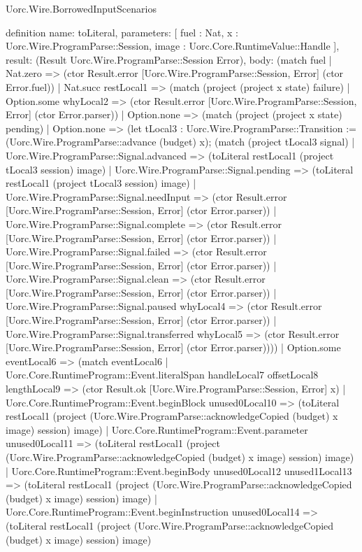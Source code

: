 \begin{lexlean}{Uorc.Wire.BorrowedInputScenarios}
\begin{semanticmodule}
definition{
  name: toLiteral,
  parameters: [
    fuel : Nat,
    x : Uorc.Wire.ProgramParse::Session,
    image : Uorc.Core.RuntimeValue::Handle
  ],
  result: (Result Uorc.Wire.ProgramParse::Session Error),
  body: (match fuel
    | Nat.zero => (ctor Result.error [Uorc.Wire.ProgramParse::Session, Error] (ctor Error.fuel))
    | Nat.succ restLocal1 => (match (project (project x state) failure)
      | Option.some whyLocal2 => (ctor Result.error [Uorc.Wire.ProgramParse::Session, Error] (ctor Error.parser))
      | Option.none => (match (project (project x state) pending)
        | Option.none => (let tLocal3 : Uorc.Wire.ProgramParse::Transition := (Uorc.Wire.ProgramParse::advance (budget) x); (match (project tLocal3 signal)
          | Uorc.Wire.ProgramParse::Signal.advanced => (toLiteral restLocal1 (project tLocal3 session) image)
          | Uorc.Wire.ProgramParse::Signal.pending => (toLiteral restLocal1 (project tLocal3 session) image)
          | Uorc.Wire.ProgramParse::Signal.needInput => (ctor Result.error [Uorc.Wire.ProgramParse::Session, Error] (ctor Error.parser))
          | Uorc.Wire.ProgramParse::Signal.complete => (ctor Result.error [Uorc.Wire.ProgramParse::Session, Error] (ctor Error.parser))
          | Uorc.Wire.ProgramParse::Signal.failed => (ctor Result.error [Uorc.Wire.ProgramParse::Session, Error] (ctor Error.parser))
          | Uorc.Wire.ProgramParse::Signal.clean => (ctor Result.error [Uorc.Wire.ProgramParse::Session, Error] (ctor Error.parser))
          | Uorc.Wire.ProgramParse::Signal.paused whyLocal4 => (ctor Result.error [Uorc.Wire.ProgramParse::Session, Error] (ctor Error.parser))
          | Uorc.Wire.ProgramParse::Signal.transferred whyLocal5 => (ctor Result.error [Uorc.Wire.ProgramParse::Session, Error] (ctor Error.parser))))
        | Option.some eventLocal6 => (match eventLocal6
          | Uorc.Core.RuntimeProgram::Event.literalSpan handleLocal7 offsetLocal8 lengthLocal9 => (ctor Result.ok [Uorc.Wire.ProgramParse::Session, Error] x)
          | Uorc.Core.RuntimeProgram::Event.beginBlock unused0Local10 => (toLiteral restLocal1 (project (Uorc.Wire.ProgramParse::acknowledgeCopied (budget) x image) session) image)
          | Uorc.Core.RuntimeProgram::Event.parameter unused0Local11 => (toLiteral restLocal1 (project (Uorc.Wire.ProgramParse::acknowledgeCopied (budget) x image) session) image)
          | Uorc.Core.RuntimeProgram::Event.beginBody unused0Local12 unused1Local13 => (toLiteral restLocal1 (project (Uorc.Wire.ProgramParse::acknowledgeCopied (budget) x image) session) image)
          | Uorc.Core.RuntimeProgram::Event.beginInstruction unused0Local14 => (toLiteral restLocal1 (project (Uorc.Wire.ProgramParse::acknowledgeCopied (budget) x image) session) image)
}
\end{semanticmodule}
\end{lexlean}
